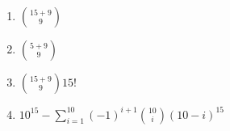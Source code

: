 \begin{enumerate}[label=(\alph*)]
\item $\binom{15+9}{9}$

\item $\binom{5+9}{9}$

\item $\binom{15+9}{9}15!$

\item $10^{15} - \sum_{i=1}^{10}\left(-1\right)^{i+1}\binom{10}{i}\left(10-i\right)^{15}$
\end{enumerate}